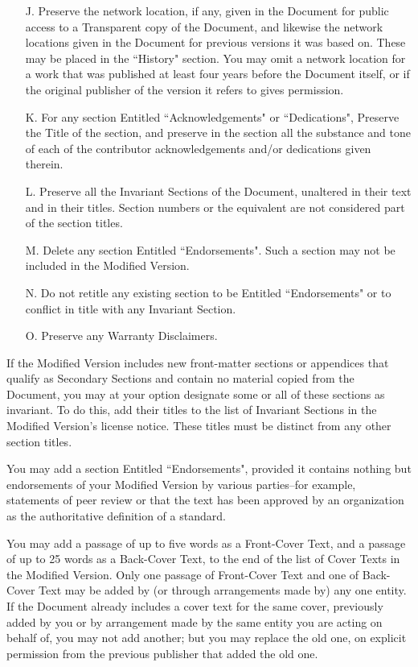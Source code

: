 \documentclass[12pt]{book}
\numberwithin{exc}{section}
\numberwithin{figure}{section}
\numberwithin{equation}{theorem}
\begin{document}
\begin{itemize}
\item[J.]
   Preserve the network location, if any, given in the Document for
   public access to a Transparent copy of the Document, and likewise
   the network locations given in the Document for previous versions
   it was based on.  These may be placed in the ``History" section.
   You may omit a network location for a work that was published at
   least four years before the Document itself, or if the original
   publisher of the version it refers to gives permission.
   
\item[K.]
   For any section Entitled ``Acknowledgements" or ``Dedications",
   Preserve the Title of the section, and preserve in the section all
   the substance and tone of each of the contributor acknowledgements
   and/or dedications given therein.
   
\item[L.]
   Preserve all the Invariant Sections of the Document,
   unaltered in their text and in their titles.  Section numbers
   or the equivalent are not considered part of the section titles.
   
\item[M.]
   Delete any section Entitled ``Endorsements".  Such a section
   may not be included in the Modified Version.
   
\item[N.]
   Do not retitle any existing section to be Entitled ``Endorsements"
   or to conflict in title with any Invariant Section.
   
\item[O.]
   Preserve any Warranty Disclaimers.
\end{itemize}

If the Modified Version includes new front-matter sections or
appendices that qualify as Secondary Sections and contain no material
copied from the Document, you may at your option designate some or all
of these sections as invariant.  To do this, add their titles to the
list of Invariant Sections in the Modified Version's license notice.
These titles must be distinct from any other section titles.

You may add a section Entitled ``Endorsements", provided it contains
nothing but endorsements of your Modified Version by various
parties--for example, statements of peer review or that the text has
been approved by an organization as the authoritative definition of a
standard.

You may add a passage of up to five words as a Front-Cover Text, and a
passage of up to 25 words as a Back-Cover Text, to the end of the list
of Cover Texts in the Modified Version.  Only one passage of
Front-Cover Text and one of Back-Cover Text may be added by (or
through arrangements made by) any one entity.  If the Document already
includes a cover text for the same cover, previously added by you or
by arrangement made by the same entity you are acting on behalf of,
you may not add another; but you may replace the old one, on explicit
permission from the previous publisher that added the old one.
\end{document}
